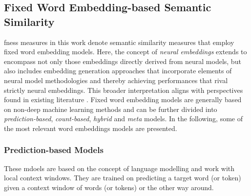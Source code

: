\documentclass[11pt, numbers=noenddot]{scrreprt}
\let\cite\parencite  %
\begin{document}
%

\subsection{Fixed Word Embedding-based Semantic Similarity}
\label{sec:fixed-word-embedding-semantic-similairity}
\gls{fness} measures in this work denote semantic similarity measures that employ fixed word embedding models. Here, the concept of \textit{neural embeddings} extends to encompass not only those embeddings directly derived from neural models, but also includes embedding generation approaches that incorporate elements of neural model methodologies and thereby achieving performances that rival strictly neural embeddings. This broader interpretation aligns with perspectives found in existing literature \cite{zucconIntegratingEvaluatingNeural2015, sezererSurveyNeuralWord2021}. Fixed word embedding models are generally based on non-deep machine learning methods and can be further divided into \textit{prediction-based}, \textit{count-based}, \textit{hybrid} and \textit{meta} models. In the following, some of the most relevant word embeddings models are presented. 

\subsubsection{Prediction-based Models} 
These mdoels are based on the concept of language modelling and work with local context windows. They are trained on predicting a target word (or token) given a context window of words (or tokens) or the other way around.
\end{document}
